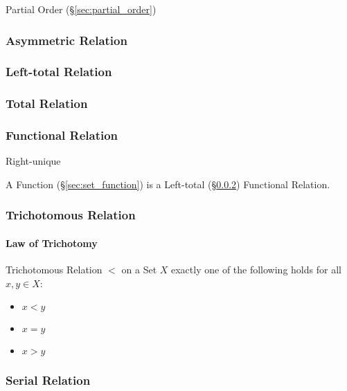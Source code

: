Partial Order (\S\ref{sec:partial_order})



\subsubsection{Asymmetric Relation}\label{sec:asymmetric_relation}

\subsubsection{Left-total Relation}\label{sec:left_total}

\subsubsection{Total Relation}\label{sec:total_relation}

\subsubsection{Functional Relation}\label{sec:functional_relation}

Right-unique

A Function (\S\ref{sec:set_function}) is a Left-total
(\S\ref{sec:left_total}) Functional Relation.



\subsubsection{Trichotomous Relation}\label{sec:trichotomous_relation}

\paragraph{Law of Trichotomy}\label{sec:trichotomy_law}\hfill

Trichotomous Relation $<$ on a Set $X$ exactly one of the following
holds for all $x,y \in X$:
\begin{itemize}
\item $x < y$
\item $x = y$
\item $x > y$
\end{itemize}



\subsubsection{Serial Relation}\label{sec:serial_relation}

